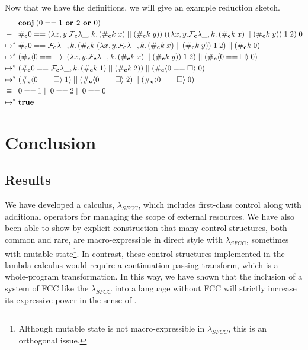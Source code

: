 \documentclass[11pt]{article}
\newcommand{\maybePage}{\null}
\newcommand\x{\lambda x}
\newcommand\F{\mathcal{F}}
\newcommand{\angles}[1]{\langle#1\rangle}
\begin{document}
Now that we have the definitions, we will give an example reduction sketch.
\begin{align*}
&\textbf{conj}\;(0 == 1\textbf{ or }2\textbf{ or }0) \\
\equiv{}\;\;& \#_\textbf c 0 ==
	(\x,y. \F_\textbf{c}\lambda \_, k.\,(\#_\textbf{c}k\;x)\;||\;(\#_\textbf{c}k\;y))
		\;((\x,y. \F_\textbf{c}\lambda \_, k.\,(\#_\textbf{c}k\;x)\;||\;(\#_\textbf{c}k\;y))
			\;1\;2)
		\;0 \\
%
\mapsto^*{}& \#_\textbf c 0 == \F_\textbf{c}\lambda \_, k.\,(\#_\textbf{c}k\;(\x,y. \F_\textbf{c}\lambda \_, k.\,(\#_\textbf{c}k\;x)\;||\;(\#_\textbf{c}k\;y))
			\;1\;2)\;||\;(\#_\textbf{c}k\;0)\\
%
\mapsto^*{}& (\#_\textbf{c}\angles{0==\square}\;\;(\x,y. \F_\textbf{c}\lambda \_, k.\,(\#_\textbf{c}k\;x)\;||\;(\#_\textbf{c}k\;y))
			\;1\;2)\;||\;(\#_\textbf{c}\angles{0==\square}\;0)\\
%
\mapsto^*{}& (\#_\textbf c 0==\F_\textbf{c}\lambda \_, k.\,(\#_\textbf c k\;1)\;||\;(\#_\textbf c k\;2))
			\;||\;(\#_\textbf c \angles{0==\square}\;0)\\
%
\mapsto^*{}& (\#_\textbf c \angles{0==\square}\;1)\;||\;(\#_\textbf c \angles{0==\square}\;2)\;||\;(\#_\textbf c \angles{0==\square}\;0)\\
\equiv{}\;\;& 0==1\;||\;0==2\;||\;0==0\\
%
\mapsto^*{}& \textbf{true}
\end{align*}

\maybePage
\section{Conclusion}
\label{sec:conclusion}

\subsection{Results}
We have developed a calculus, $\lambda_{SFCC}$, which includes first-class control along with additional operators for managing the scope of external resources.
We have also been able to show by explicit construction that many control structures, both common and rare, are macro-expressible in direct style with $\lambda_{SFCC}$, sometimes with mutable state\footnote{Although mutable state is not macro-expressible in $\lambda_{SFCC}$, this is an orthogonal issue.}.
In contrast, these control structures implemented in the lambda calculus would require a continuation-passing transform, which is a whole-program transformation.
In this way, we have shown that the inclusion of a system of FCC like the $\lambda_{SFCC}$ into a language without FCC will strictly increase its expressive power in the sense of \cite{Felleisen90expressive}.
\end{document}
